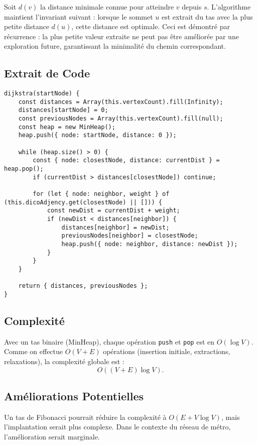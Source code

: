 \documentclass[a4paper,12pt]{article}
\begin{document}
Soit $d(v)$ la distance minimale connue pour atteindre $v$ depuis $s$. L’algorithme maintient l’invariant suivant : lorsque le sommet $u$ est extrait du tas avec la plus petite distance $d(u)$, cette distance est optimale. Ceci est démontré par récurrence : la plus petite valeur extraite ne peut pas être améliorée par une exploration future, garantissant la minimalité du chemin correspondant.

\subsection{Extrait de Code}

\begin{verbatim}
dijkstra(startNode) {
    const distances = Array(this.vertexCount).fill(Infinity);
    distances[startNode] = 0;
    const previousNodes = Array(this.vertexCount).fill(null);
    const heap = new MinHeap();
    heap.push({ node: startNode, distance: 0 });

    while (heap.size() > 0) {
        const { node: closestNode, distance: currentDist } = heap.pop();
        if (currentDist > distances[closestNode]) continue;

        for (let { node: neighbor, weight } of (this.dicoAdjency.get(closestNode) || [])) {
            const newDist = currentDist + weight;
            if (newDist < distances[neighbor]) {
                distances[neighbor] = newDist;
                previousNodes[neighbor] = closestNode;
                heap.push({ node: neighbor, distance: newDist });
            }
        }
    }

    return { distances, previousNodes };
}
\end{verbatim}

\subsection{Complexité}

Avec un tas binaire (MinHeap), chaque opération \texttt{push} et \texttt{pop} est en $O(\log V)$. Comme on effectue $O(V+E)$ opérations (insertion initiale, extractions, relaxations), la complexité globale est :
\[
O((V+E)\log V).
\]

\subsection{Améliorations Potentielles}

Un tas de Fibonacci pourrait réduire la complexité à $O(E + V\log V)$, mais l'implantation serait plus complexe. Dans le contexte du réseau de métro, l’amélioration serait marginale.
\end{document}
